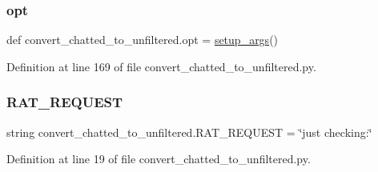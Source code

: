 \subsubsection{\texorpdfstring{opt}{opt}}
{\footnotesize\ttfamily def convert\+\_\+chatted\+\_\+to\+\_\+unfiltered.\+opt = \hyperlink{namespaceconvert__chatted__to__unfiltered_a693c3e8f97d34c4fe03e7694099fe41e}{setup\+\_\+args}()}



Definition at line 169 of file convert\+\_\+chatted\+\_\+to\+\_\+unfiltered.\+py.

\mbox{\label{namespaceconvert__chatted__to__unfiltered_a4b47f379586283d2c2f8ef5ea4411400}} 
\subsubsection{\texorpdfstring{R\+A\+T\+\_\+\+R\+E\+Q\+U\+E\+ST}{RAT\_REQUEST}}
{\footnotesize\ttfamily string convert\+\_\+chatted\+\_\+to\+\_\+unfiltered.\+R\+A\+T\+\_\+\+R\+E\+Q\+U\+E\+ST = \char`\"{}just checking\+:\char`\"{}}



Definition at line 19 of file convert\+\_\+chatted\+\_\+to\+\_\+unfiltered.\+py.

